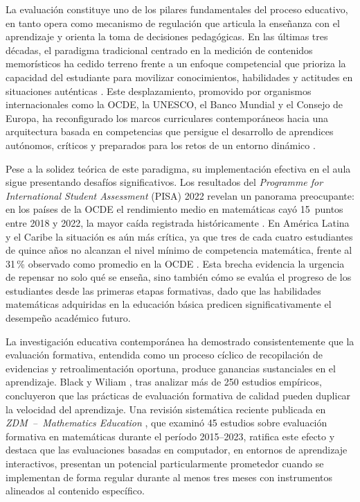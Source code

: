
La evaluación constituye uno de los pilares fundamentales del proceso educativo, en tanto opera como mecanismo de regulación que articula la enseñanza con el aprendizaje y orienta la toma de decisiones pedagógicas. En las últimas tres décadas, el paradigma tradicional centrado en la medición de contenidos memorísticos ha cedido terreno frente a un enfoque competencial que prioriza la capacidad del estudiante para movilizar conocimientos, habilidades y actitudes en situaciones auténticas \cite{black1998inside,oecd2019compass}. Este desplazamiento, promovido por organismos internacionales como la OCDE, la UNESCO, el Banco Mundial y el Consejo de Europa, ha reconfigurado los marcos curriculares contemporáneos hacia una arquitectura basada en competencias que persigue el desarrollo de aprendices autónomos, críticos y preparados para los retos de un entorno dinámico \cite{unesco2022contract,voinea2025competency}.

Pese a la solidez teórica de este paradigma, su implementación efectiva en el aula sigue presentando desafíos significativos. Los resultados del \textit{Programme for International Student Assessment} (PISA) 2022 revelan un panorama preocupante: en los países de la OCDE el rendimiento medio en matemáticas cayó 15~puntos entre 2018 y 2022, la mayor caída registrada históricamente \cite{oecd2023pisa}. En América Latina y el Caribe la situación es aún más crítica, ya que tres de cada cuatro estudiantes de quince años no alcanzan el nivel mínimo de competencia matemática, frente al 31\,\% observado como promedio en la OCDE \cite{bid2023pisa,unesco2024lac}. Esta brecha evidencia la urgencia de repensar no solo qué se enseña, sino también cómo se evalúa el progreso de los estudiantes desde las primeras etapas formativas, dado que las habilidades matemáticas adquiridas en la educación básica predicen significativamente el desempeño académico futuro.

La investigación educativa contemporánea ha demostrado consistentemente que la evaluación formativa, entendida como un proceso cíclico de recopilación de evidencias y retroalimentación oportuna, produce ganancias sustanciales en el aprendizaje. Black y Wiliam \cite{black1998inside}, tras analizar más de 250 estudios empíricos, concluyeron que las prácticas de evaluación formativa de calidad pueden duplicar la velocidad del aprendizaje. Una revisión sistemática reciente publicada en \textit{ZDM~--~Mathematics Education} \cite{maskos2025fa}, que examinó 45 estudios sobre evaluación formativa en matemáticas durante el período 2015--2023, ratifica este efecto y destaca que las evaluaciones basadas en computador, en entornos de aprendizaje interactivos, presentan un potencial particularmente prometedor cuando se implementan de forma regular durante al menos tres meses con instrumentos alineados al contenido específico.

